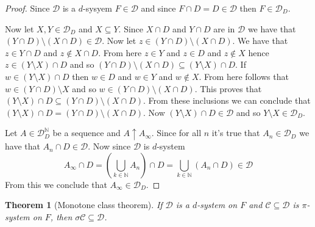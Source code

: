 \documentclass[a4paper]{amsart}
\newtheorem{thm}{Theorem}
\newcommand{\NN}{\mathbb{N}}
\newcommand{\convg}{\uparrow}
\begin{document}
\begin{proof}
    Since $\mathcal{D}$ is a $d$-sysyem 
    $F \in \mathcal{D}$ and since $F \cap D = D \in \mathcal{D}$ 
    then $F \in \mathcal{D}_D$. 
    
    Now let $X,Y \in \mathcal{D}_D$ and $X \subseteq Y$.
    Since $X \cap D$ and $Y \cap D$ are in $\mathcal{D}$ we have that 
    $ \left(Y \cap D\right) \setminus \left(X \cap D\right) \in \mathcal{D}$. 
    Now let $z \in  \left(Y \cap D\right) \setminus \left(X \cap D\right)$. 
    We have that $z \in Y \cap D$ and $z \notin X \cap D$. 
    From here $z \in Y$ and $z \in D$ and $z \notin X$ hence $z \in \left(Y \setminus X\right) \cap D$ and so
    $
    \left(Y\cap D\right) \setminus \left(X\cap D\right) \subseteq  \left(Y \setminus X\right) \cap D
    $. If $w \in \left(Y \setminus X\right) \cap D $ then 
    $w \in D$ and $w \in Y$ and $w \notin X$. From here follows that $w \in \left(Y \cap D\right) \setminus X$
    and so $w  \in \left(Y \cap D\right) \setminus \left(X \cap D \right)$.
    This proves that $ \left(Y \setminus X\right) \cap D  \subseteq\left(Y \cap D\right) \setminus \left(X \cap D \right)$.
    From these inclusions we can conclude that 
    $\left(Y \setminus X\right) \cap D  = \left(Y \cap D\right) \setminus \left(X \cap D \right)$.
    Now $\left(Y \setminus X\right) \cap D  \in \mathcal{D}$ and so $Y \setminus X \in \mathcal{D}_D$.
    
    Let $A \in \mathcal{D}_D^\NN$ be a sequence and $A \convg A_\infty$.
    Since for all $n$ it's true that $A_n \in \mathcal{D}_D$ we have that $A_n \cap D \in \mathcal{D}$.
    Now since $\mathcal{D}$ is $d$-system 
    $$ A_\infty \cap D = \left(\bigcup\limits_{k \in \NN} A_n\right) \cap D = \bigcup\limits_{k \in \NN} \left(A_n \cap D\right) \in \mathcal{D}$$
    From this we conclude that $A_\infty \in \mathcal{D}_D$.
\end{proof}


\begin{thm}[Monotone class theorem]
    If $\mathcal{D}$ is a $d$-system on $F$ and $\mathcal{C}\subseteq \mathcal{D}$
    is $\pi$-system on $F$, then $\sigma\mathcal{C} \subseteq \mathcal{D}$.
\end{thm}
\end{document}
